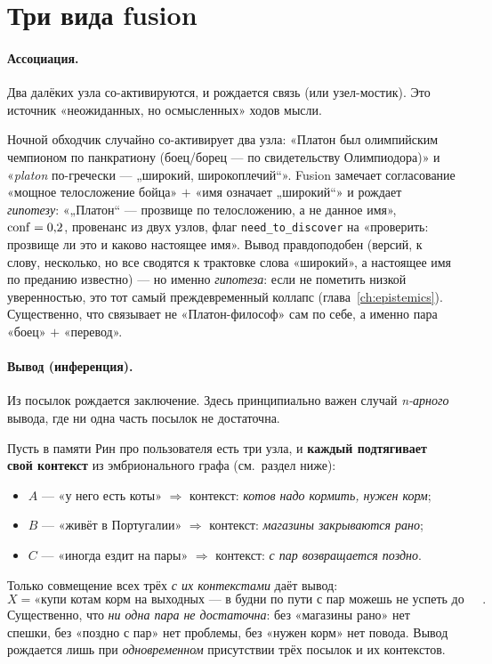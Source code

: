 \section{Три вида fusion}

\paragraph{Ассоциация.} Два далёких узла со-активируются, и рождается связь (или
узел-мостик). Это источник «неожиданных, но осмысленных» ходов мысли.

\begin{workedbox}
Ночной обходчик случайно со-активирует два узла: «Платон был олимпийским чемпионом
по панкратиону (боец/борец — по свидетельству Олимпиодора)» и «\emph{platon}
по-гречески — „широкий, широкоплечий“». Fusion замечает согласование «мощное
телосложение бойца» $+$ «имя означает „широкий“» и рождает \emph{гипотезу}:
«„Платон“ — прозвище по телосложению, а не данное имя», $\mathrm{conf}=0{,}2$, провенанс из
двух узлов, флаг \texttt{need\_to\_discover} на «проверить: прозвище ли это и каково
настоящее имя». Вывод правдоподобен (версий, к слову, несколько, но все сводятся к
трактовке слова «широкий», а настоящее имя по преданию известно) — но именно
\emph{гипотеза}: если не пометить низкой уверенностью, это тот самый преждевременный
коллапс (глава~\ref{ch:epistemics}). Существенно, что связывает не «Платон-философ»
сам по себе, а именно пара «боец» $+$ «перевод».
\end{workedbox}

\paragraph{Вывод (инференция).} Из посылок рождается заключение. Здесь принципиально
важен случай \emph{n-арного} вывода, где ни одна часть посылок не достаточна.

\begin{workedbox}
Пусть в памяти Рин про пользователя есть три узла, и \textbf{каждый подтягивает свой
контекст} из эмбрионального графа (см.\ раздел ниже):
\begin{itemize}\itemsep2pt
\item $A$ — «у него есть коты» $\Rightarrow$ контекст: \emph{котов надо кормить,
нужен корм};
\item $B$ — «живёт в Португалии» $\Rightarrow$ контекст: \emph{магазины закрываются
рано};
\item $C$ — «иногда ездит на пары» $\Rightarrow$ контекст: \emph{с пар возвращается
поздно}.
\end{itemize}
Только совмещение всех трёх \emph{с их контекстами} даёт вывод:
\[
X=\text{«купи котам корм на выходных — в будни по пути с пар можешь не успеть до закрытия»}.
\]
Существенно, что \emph{ни одна пара не достаточна}: без «магазины рано» нет спешки,
без «поздно с пар» нет проблемы, без «нужен корм» нет повода. Вывод рождается лишь
при \emph{одновременном} присутствии трёх посылок и их контекстов.
\end{workedbox}

